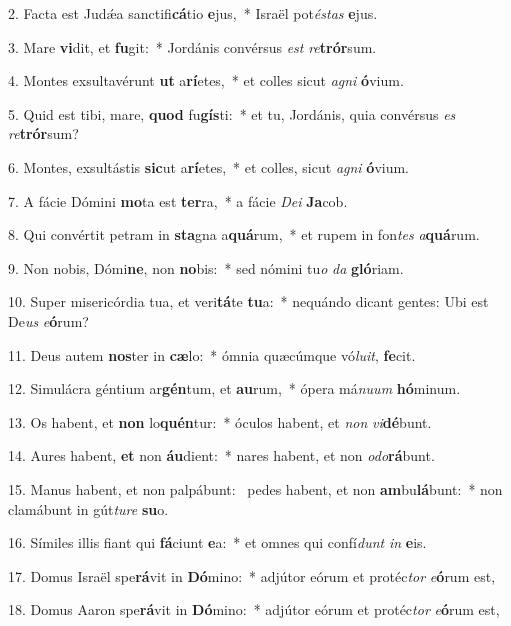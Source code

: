 2. Facta est Judǽa sanctifi\textbf{cá}tio \textbf{e}jus,~*  Israël pot\textit{és}\textit{tas} \textbf{e}jus.\

3. Mare \textbf{vi}dit, et \textbf{fu}git:~*  Jordánis convérsus \textit{est} \textit{re}\textbf{trór}sum.\

4. Montes exsultavérunt \textbf{ut} a\textbf{rí}etes,~*  et colles sicut \textit{a}\textit{gni} \textbf{ó}vium.\

5. Quid est tibi, mare, \textbf{quod} fu\textbf{gís}ti:~*  et tu, Jordánis, quia convérsus \textit{es} \textit{re}\textbf{trór}sum?\

6. Montes, exsultástis \textbf{sic}ut a\textbf{rí}etes,~*  et colles, sicut \textit{a}\textit{gni} \textbf{ó}vium.\

7. A fácie Dómini \textbf{mo}ta est \textbf{ter}ra,~*  a fácie \textit{De}\textit{i} \textbf{Ja}cob.\

8. Qui convértit petram in \textbf{sta}gna a\textbf{quá}rum,~*  et rupem in fon\textit{tes} \textit{a}\textbf{quá}rum.\

9. Non nobis, Dómi\textbf{ne}, non \textbf{no}bis:~*  sed nómini tu\textit{o} \textit{da} \textbf{gló}riam.\

10. Super misericórdia tua, et veri\textbf{tá}te \textbf{tu}a:~*  nequándo dicant gentes: Ubi est De\textit{us} \textit{e}\textbf{ó}rum?\

11. Deus autem \textbf{nos}ter in \textbf{cæ}lo:~*  ómnia quæcúmque vó\textit{lu}\textit{it}, \textbf{fe}cit.\

12. Simulácra géntium ar\textbf{gén}tum, et \textbf{au}rum,~*  ópera má\textit{nu}\textit{um} \textbf{hó}minum.\

13. Os habent, et \textbf{non} lo\textbf{quén}tur:~*  óculos habent, et \textit{non} \textit{vi}\textbf{dé}bunt.\

14. Aures habent, \textbf{et} non \textbf{áu}dient:~*  nares habent, et non \textit{o}\textit{do}\textbf{rá}bunt.\

15. Manus habent, et non palpábunt: \dag\  pedes habent, et non \textbf{am}bu\textbf{lá}bunt:~*  non clamábunt in gút\textit{tu}\textit{re} \textbf{su}o.\

16. Símiles illis fiant qui \textbf{fá}ciunt \textbf{e}a:~*  et omnes qui confí\textit{dunt} \textit{in} \textbf{e}is.\

17. Domus Israël spe\textbf{rá}vit in \textbf{Dó}mino:~*  adjútor eórum et protéc\textit{tor} \textit{e}\textbf{ó}rum est,\

18. Domus Aaron spe\textbf{rá}vit in \textbf{Dó}mino:~*  adjútor eórum et protéc\textit{tor} \textit{e}\textbf{ó}rum est,\

